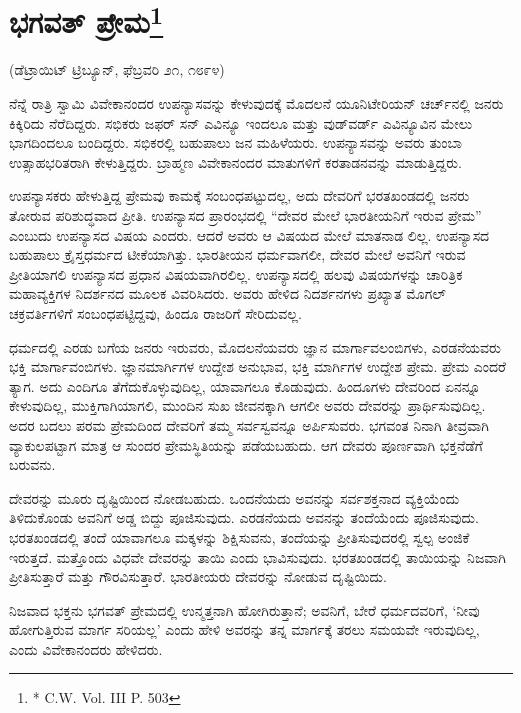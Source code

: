 \delimiter


\section[ಭಗವತ್ ಪ್ರೇಮ]{ಭಗವತ್ ಪ್ರೇಮ\protect\footnote{* C.W. Vol. III P. 503}}

\begin{center}
(ಡೆಟ್ರಾಯಿಟ್​ ಟ್ರಿಬ್ಯೂನ್​, ಫೆಬ್ರವರಿ ೨೧, ೧೮೯೪)
\end{center}

ನೆನ್ನೆ ರಾತ್ರಿ ಸ್ವಾಮಿ ವಿವೇಕಾನಂದರ ಉಪನ್ಯಾಸವನ್ನು ಕೇಳುವುದಕ್ಕೆ ಮೊದಲನೆ ಯೂನಿಟೇರಿಯನ್​ ಚರ್ಚ್​ನಲ್ಲಿ ಜನರು ಕಿಕ್ಕಿರಿದು ನೆರೆದಿದ್ದರು. ಸಭಿಕರು ಜಫರ್​ ಸನ್​ ಎವಿನ್ಯೂ ಇಂದಲೂ ಮತ್ತು ವುಡ್​ವರ್ಡ್​ ಎವಿನ್ಯೂವಿನ ಮೇಲು ಭಾಗದಿಂದಲೂ ಬಂದಿದ್ದರು. ಸಭಿಕರಲ್ಲಿ ಬಹುಪಾಲು ಜನ ಮಹಿಳೆಯರು. ಉಪನ್ಯಾಸವನ್ನು ಅವರು ತುಂಬಾ ಉತ್ಸಾಹಭರಿತರಾಗಿ ಕೇಳುತ್ತಿದ್ದರು. ಬ್ರಾಹ್ಮಣ ವಿವೇಕಾನಂದರ ಮಾತುಗಳಿಗೆ ಕರತಾಡನವನ್ನು ಮಾಡುತ್ತಿದ್ದರು.

ಉಪನ್ಯಾಸಕರು ಹೇಳುತ್ತಿದ್ದ ಪ್ರೇಮವು ಕಾಮಕ್ಕೆ ಸಂಬಂಧಪಟ್ಟುದಲ್ಲ, ಅದು ದೇವರಿಗೆ ಭರತಖಂಡದಲ್ಲಿ ಜನರು ತೋರುವ ಪರಿಶುದ್ಧವಾದ ಪ್ರೀತಿ. ಉಪನ್ಯಾಸದ ಪ್ರಾರಂಭದಲ್ಲಿ “ದೇವರ ಮೇಲೆ ಭಾರತೀಯನಿಗೆ ಇರುವ ಪ್ರೇಮ” ಎಂಬುದು ಉಪನ್ಯಾಸದ ವಿಷಯ ಎಂದರು. ಆದರೆ ಅವರು ಆ ವಿಷಯದ ಮೇಲೆ ಮಾತನಾಡ ಲಿಲ್ಲ. ಉಪನ್ಯಾಸದ ಬಹುಪಾಲು ಕ್ರೈಸ್ತಧರ್ಮದ ಟೀಕೆಯಾಗಿತ್ತು. ಭಾರತೀಯನ ಧರ್ಮವಾಗಲೀ, ದೇವರ ಮೇಲೆ ಅವನಿಗೆ ಇರುವ ಪ್ರೀತಿಯಾಗಲಿ ಉಪನ್ಯಾಸದ ಪ್ರಧಾನ ವಿಷಯವಾಗಿರಲಿಲ್ಲ. ಉಪನ್ಯಾಸದಲ್ಲಿ ಹಲವು ವಿಷಯಗಳನ್ನು ಚಾರಿತ್ರಿಕ ಮಹಾವ್ಯಕ್ತಿಗಳ ನಿದರ್ಶನದ ಮೂಲಕ ವಿವರಿಸಿದರು. ಅವರು ಹೇಳಿದ ನಿದರ್ಶನಗಳು ಪ್ರಖ್ಯಾತ ಮೊಗಲ್​ ಚಕ್ರವರ್ತಿಗಳಿಗೆ ಸಂಬಂಧಪಟ್ಟಿದ್ದವು, ಹಿಂದೂ ರಾಜರಿಗೆ ಸೇರಿದುವಲ್ಲ.

ಧರ್ಮದಲ್ಲಿ ಎರಡು ಬಗೆಯ ಜನರು ಇರುವರು, ಮೊದಲನೆಯವರು ಜ್ಞಾನ ಮಾರ್ಗಾವಲಂಬಿಗಳು, ಎರಡನೆಯವರು ಭಕ್ತಿ ಮಾರ್ಗಾವಂಬಿಗಳು. ಜ್ಞಾನಮಾರ್ಗಿಗಳ ಉದ್ದೇಶ ಅನುಭಾವ, ಭಕ್ತಿ ಮಾರ್ಗಿಗಳ ಉದ್ದೇಶ ಪ್ರೇಮ. ಪ್ರೇಮ ಎಂದರೆ ತ್ಯಾಗ. ಅದು ಎಂದಿಗೂ ತೆಗೆದುಕೊಳ್ಳುವುದಿಲ್ಲ, ಯಾವಾಗಲೂ ಕೊಡುವುದು. ಹಿಂದೂಗಳು ದೇವರಿಂದ ಏನನ್ನೂ ಕೇಳುವುದಿಲ್ಲ, ಮುಕ್ತಿಗಾಗಿಯಾಗಲಿ, ಮುಂದಿನ ಸುಖ ಜೀವನಕ್ಕಾಗಿ ಆಗಲೀ ಅವರು ದೇವರನ್ನು ಪ್ರಾರ್ಥಿಸುವುದಿಲ್ಲ. ಅದರ ಬದಲು ಪರಮ ಪ್ರೇಮದಿಂದ ದೇವರಿಗೆ ತಮ್ಮ ಸರ್ವಸ್ವವನ್ನೂ ಅರ್ಪಿಸುವರು. ಭಗವಂತ ನಿನಾಗಿ ತೀವ್ರವಾಗಿ ವ್ಯಾಕುಲಪಟ್ಟಾಗ ಮಾತ್ರ ಆ ಸುಂದರ ಪ್ರೇಮಸ್ಥಿತಿಯನ್ನು ಪಡೆಯಬಹುದು. ಆಗ ದೇವರು ಪೂರ್ಣವಾಗಿ ಭಕ್ತನೆಡೆಗೆ ಬರುವನು.

ದೇವರನ್ನು ಮೂರು ದೃಷ್ಟಿಯಿಂದ ನೋಡಬಹುದು. ಒಂದನೆಯದು ಅವನನ್ನು ಸರ್ವಶಕ್ತನಾದ ವ್ಯಕ್ತಿಯೆಂದು ತಿಳಿದುಕೊಂಡು ಅವನಿಗೆ ಅಡ್ಡ ಬಿದ್ದು ಪೂಜಿಸುವುದು. ಎರಡನೆಯದು ಅವನನ್ನು ತಂದೆಯೆಂದು ಪೂಜಿಸುವುದು. ಭರತಖಂಡದಲ್ಲಿ ತಂದೆ ಯಾವಾಗಲೂ ಮಕ್ಕಳನ್ನು ಶಿಕ್ಷಿಸುವನು, ತಂದೆಯನ್ನು ಪ್ರೀತಿಸುವುದರಲ್ಲಿ ಸ್ವಲ್ಪ ಅಂಜಿಕೆ ಇರುತ್ತದೆ. ಮತ್ತೊಂದು ವಿಧವೇ ದೇವರನ್ನು ತಾಯಿ ಎಂದು ಭಾವಿಸುವುದು. ಭರತಖಂಡದಲ್ಲಿ ತಾಯಿಯನ್ನು ನಿಜವಾಗಿ ಪ್ರೀತಿಸುತ್ತಾರೆ ಮತ್ತು ಗೌರವಿಸುತ್ತಾರೆ. ಭಾರತೀಯರು ದೇವರನ್ನು ನೋಡುವ ದೃಷ್ಟಿಯಿದು.

ನಿಜವಾದ ಭಕ್ತನು ಭಗವತ್​ ಪ್ರೇಮದಲ್ಲಿ ಉನ್ಮತ್ತನಾಗಿ ಹೋಗಿರುತ್ತಾನೆ; ಅವನಿಗೆ, ಬೇರೆ ಧರ್ಮದವರಿಗೆ, ‘ನೀವು ಹೋಗುತ್ತಿರುವ ಮಾರ್ಗ ಸರಿಯಲ್ಲ’ ಎಂದು ಹೇಳಿ ಅವರನ್ನು ತನ್ನ ಮಾರ್ಗಕ್ಕೆ ತರಲು ಸಮಯವೇ ಇರುವುದಿಲ್ಲ, ಎಂದು ವಿವೇಕಾನಂದರು ಹೇಳಿದರು.

